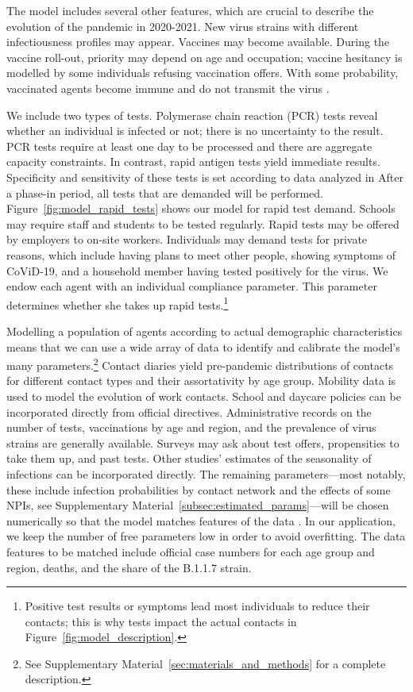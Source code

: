The model includes several other features, which are crucial to describe the evolution
of the pandemic in 2020-2021. New virus strains with different infectiousness profiles
may appear. Vaccines may become available. During the vaccine roll-out, priority may
depend on age and occupation; vaccine hesitancy is modelled by some individuals refusing
vaccination offers. With some probability, vaccinated agents become immune and do not
transmit the virus \citep{Hunter2021, LevineTiefenbrun2021, Petter2021, Pritchard2021}.

We include two types of tests. Polymerase chain reaction (PCR) tests reveal whether an
individual is infected or not; there is no uncertainty to the result. PCR tests require
at least one day to be processed and there are aggregate capacity constraints. In
contrast, rapid antigen tests yield immediate results. Specificity and sensitivity of
these tests is set according to data analyzed in
\label{r.1.a}
After a phase-in period, all tests that are demanded will be performed.
Figure~\ref{fig:model_rapid_tests} shows our model for rapid test demand. Schools may
require staff and students to be tested regularly. Rapid tests may be offered by
employers to on-site workers. Individuals may demand tests for private reasons, which
include having plans to meet other people, showing symptoms of CoViD-19, and a household
member having tested positively for the virus. We endow each agent with an individual
compliance parameter. This parameter determines whether she takes up rapid
tests.\footnote{Positive test results or symptoms lead most individuals to reduce their
    contacts; this is why tests impact the actual contacts in
    Figure~\ref{fig:model_description}.}

Modelling a population of agents according to actual demographic characteristics means
that we can use a wide array of data to identify and calibrate the model's many
parameters.\footnote{See Supplementary Material~\ref{sec:materials_and_methods} for a
    complete description.} Contact diaries yield pre-pandemic distributions of contacts for
different contact types and their assortativity by age group. Mobility data is used to
model the evolution of work contacts. School and daycare policies can be incorporated
directly from official directives. Administrative records on the number of tests,
vaccinations by age and region, and the prevalence of virus strains are generally
available. Surveys may ask about test offers, propensities to take them up, and past
tests. Other studies' estimates of the seasonality of infections can be incorporated
directly. The remaining parameters---most notably, these include infection probabilities
by contact network and the effects of some NPIs, see Supplementary
Material~\ref{subsec:estimated_params}---will be chosen numerically so that the model
matches features of the data \citep[see][for the general method]{McFadden1989}. In our
application, we keep the number of free parameters low in order to avoid overfitting.
The data features to be matched include official case numbers for each age group and
region, deaths, and the share of the B.1.1.7 strain.

